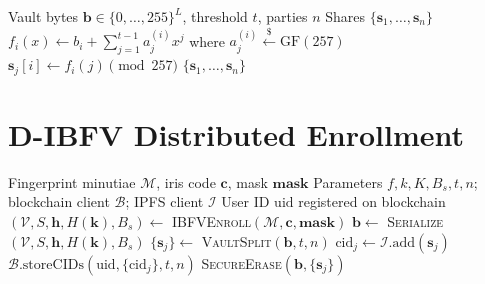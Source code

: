 \begin{algorithm}[H]
\caption{D-IBFV Vault Splitting (Shamir over GF(257))}
\label{alg:vault_split}
\begin{algorithmic}[1]
\Require Vault bytes $\mathbf{b} \in \{0,\ldots,255\}^L$, threshold $t$, parties $n$
\Ensure Shares $\{\mathbf{s}_1, \ldots, \mathbf{s}_n\}$
  \State $f_i(x) \leftarrow b_i + \sum_{j=1}^{t-1} a_j^{(i)} x^j$ where $a_j^{(i)} \stackrel{\$}{\leftarrow} \mathrm{GF}(257)$
    \State $\mathbf{s}_j[i] \leftarrow f_i(j) \pmod{257}$ 
  \EndFor
\EndFor
\State \Return $\{\mathbf{s}_1, \ldots, \mathbf{s}_n\}$
\end{algorithmic}
\end{algorithm}

\section{D-IBFV Distributed Enrollment}

\begin{algorithm}[H]
\caption{D-IBFV Distributed Enrollment}
\label{alg:dibfv_enroll}
\begin{algorithmic}[1]
\Require Fingerprint minutiae $\mathcal{M}$, iris code $\mathbf{c}$, mask $\mathbf{mask}$
\Require Parameters $f, k, K, B_s, t, n$; blockchain client $\mathcal{B}$; IPFS client $\mathcal{I}$
\Ensure User ID $\mathrm{uid}$ registered on blockchain
\State $(\mathcal{V}, S, \mathbf{h}, H(\mathbf{k}), B_s) \leftarrow$ \textsc{IBFVEnroll}$(\mathcal{M}, \mathbf{c}, \mathbf{mask})$ 
\State $\mathbf{b} \leftarrow$ \textsc{Serialize}$(\mathcal{V}, S, \mathbf{h}, H(\mathbf{k}), B_s)$ 
\State $\{\mathbf{s}_j\} \leftarrow$ \textsc{VaultSplit}$(\mathbf{b}, t, n)$ 
  \State $\mathrm{cid}_j \leftarrow \mathcal{I}.\mathrm{add}(\mathbf{s}_j)$ 
\EndFor
\State $\mathcal{B}.\mathrm{storeCIDs}(\mathrm{uid}, \{\mathrm{cid}_j\}, t, n)$ 
\State \textsc{SecureErase}$(\mathbf{b}, \{\mathbf{s}_j\})$
\end{algorithmic}
\end{algorithm}

